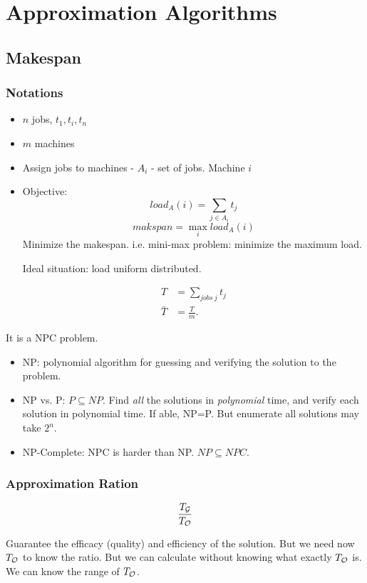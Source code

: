 \documentclass[a4paper]{report}
\theoremstyle{definition}
\begin{document}
\chapter{Approximation Algorithms}
\section{Makespan}
\subsection{Notations}
\begin{itemize}
\item $n$ jobs, $t_1, t_i, t_n$
\item $m$ machines
\item Assign jobs to machines - $A_i$ - set of jobs. Machine $i$
\item Objective:
$$load_A(i)=\sum_{j\in A_i} t_j$$
$$makspan = \max_i load_A(i)$$
Minimize the makespan. i.e. mini-max problem: minimize the maximum load.

Ideal situation: load uniform distributed.

\begin{align*}
T&=\sum_{jobs~j}t_j\\
\bar T &= \frac{T}{m}.
\end{align*}
\end{itemize}

It is a NPC problem.

\begin{itemize}
\item NP: polynomial algorithm for guessing and verifying the solution to the problem.
\item NP vs. P: $P\subseteq NP$. Find \textit{all} the solutions in \textit{polynomial} time, and verify each solution in polynomial time. If able, NP=P. But enumerate all solutions may take $2^n$.
\item NP-Complete: NPC is harder than NP. $NP\subseteq NPC$.
\end{itemize}

\subsection{Approximation Ration}
$$
\frac{T_{\mathcal{G}}}{T_{\mathcal{O}}}
$$

Guarantee the efficacy (quality) and efficiency of the solution. But we need now $T_{\mathcal{O}}$ to know the ratio. But we can calculate without knowing what exactly $T_{\mathcal{O}}$ is. We can know the range of $T_{\mathcal{O}}$.
\end{document}

